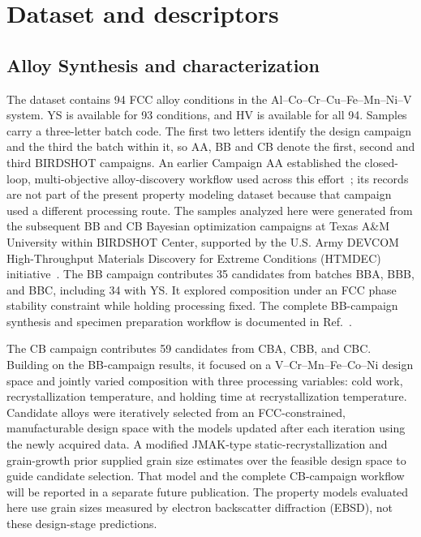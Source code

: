 \documentclass[5p,times,twocolumn]{elsarticle}
\begin{document}
\section{Dataset and descriptors}
\label{sec:data}

\subsection{Alloy Synthesis and characterization}

The dataset contains 94 FCC alloy conditions in the Al--Co--Cr--Cu--Fe--Mn--Ni--V system. YS is available for 93 conditions, and HV is available for all 94. Samples carry a three-letter batch code. The first two letters identify the design campaign and the third the batch within it, so AA, BB and CB denote the first, second and third BIRDSHOT campaigns. An earlier Campaign AA established the closed-loop, multi-objective alloy-discovery workflow used across this effort~\cite{Hastings2025FCC}; its records are not part of the present property modeling dataset because that campaign used a different processing route. The samples analyzed here were generated from the subsequent BB and CB Bayesian optimization campaigns at Texas A\&M University within BIRDSHOT Center, supported by the U.S. Army DEVCOM High-Throughput Materials Discovery for Extreme Conditions (HTMDEC) initiative~\cite{Mulukutla2024BIRDSHOT,Mulukutla2026BRAVE}. The BB campaign contributes 35 candidates from batches BBA, BBB, and BBC, including 34 with YS. It explored composition under an FCC phase stability constraint while holding processing fixed. The complete BB-campaign synthesis and specimen preparation workflow is documented in Ref.~\cite{Mulukutla2026BRAVE}.

The CB campaign contributes 59 candidates from CBA, CBB, and CBC. Building on the BB-campaign results, it focused on a V--Cr--Mn--Fe--Co--Ni design space and jointly varied composition with three processing variables: cold work, recrystallization temperature, and holding time at recrystallization temperature. Candidate alloys were iteratively selected from an FCC-constrained, manufacturable design space with the models updated after each iteration using the newly acquired data. A modified JMAK-type static-recrystallization and grain-growth prior supplied grain size estimates over the feasible design space to guide candidate selection. That model and the complete CB-campaign workflow will be reported in a separate future publication. The property models evaluated here use grain sizes measured by electron backscatter diffraction (EBSD), not these design-stage predictions.
\end{document}
